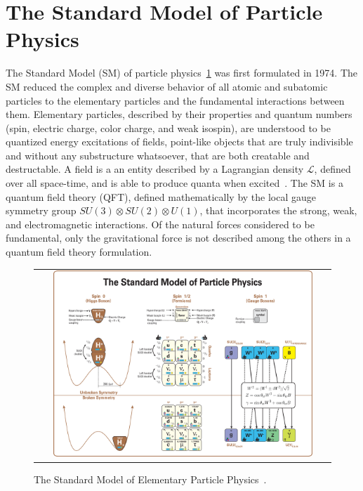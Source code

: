 \section{The Standard Model of Particle Physics}
The Standard Model (SM) of particle physics~\ref{Standard_Model} was first formulated in 1974.
The SM reduced the complex and diverse behavior of all atomic and subatomic particles to the elementary particles and the fundamental interactions between them. 
Elementary particles, described by their properties and quantum numbers (spin, electric charge, color charge, and  weak isospin), are understood to be quantized energy excitations of fields, point-like objects that are truly indivisible and without any substructure whatsoever, that are both creatable and destructable.
A field is a an entity described by a Lagrangian density $\mathcal{L}$, defined over all space-time, and is able to produce quanta when excited~\cite{nagashima_2013_V1}.
The SM is a quantum field theory (QFT), defined mathematically by the local gauge symmetry group $SU(3) \otimes SU(2) \otimes U(1)$, that incorporates the strong, weak, and electromagnetic interactions.
Of the natural forces considered to be fundamental, only the gravitational force is not described among the others in a quantum field theory formulation.
\begin{figure}[!ht]
  \begin{center}
    \begin{tabular}{c}
        \includegraphics[width=0.90\textwidth]{fig_Theory/Standard_Model.png}
    \end{tabular}
    \caption{The Standard Model of Elementary Particle Physics~\cite{StandardModel}.
            }
    \label{Standard_Model}
  \end{center}
\end{figure}

